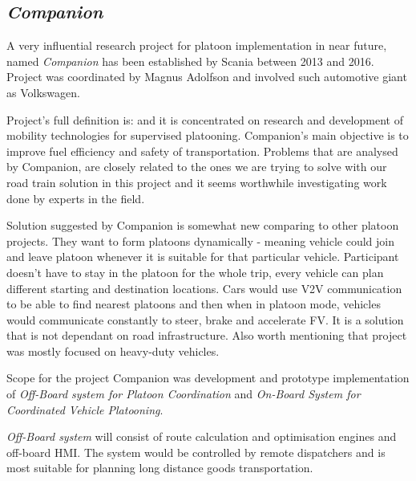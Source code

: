 \subsection{\textit{Companion}}\label{sec:Companion}
% 
A very influential research project for platoon implementation in near future, named \emph{Companion} \cite{2016CompanionProject} has been established by Scania between 2013 and 2016. Project was coordinated by Magnus Adolfson and involved such automotive giant as Volkswagen.\par
% 
Project's full definition is:  and it is concentrated on research and development of mobility technologies for supervised platooning. Companion's main objective is to improve fuel efficiency and safety of transportation.%
% 
%
% 
Problems that are analysed by Companion, are closely related to the ones we are trying to solve with our road train solution in this project and it seems worthwhile investigating work done by experts in the field\footnotemark.\par
% 
% 
Solution suggested by Companion is somewhat new comparing to other platoon projects. They want to form platoons dynamically - meaning vehicle could join and leave platoon whenever it is suitable for that particular vehicle. Participant doesn't have to stay in the platoon for the whole trip, every vehicle can plan different starting and destination locations. Cars would use \acrshort{V2V} communication to be able to find nearest platoons and then when in platoon mode, vehicles would communicate constantly to steer, brake and accelerate \acrfull{FV}. It is a solution that is not dependant on road infrastructure. Also worth mentioning that project was mostly focused on heavy-duty vehicles.\par
% 
Scope for the project Companion was development and prototype implementation of \emph{Off-Board system for Platoon Coordination} and \emph{On-Board System for Coordinated Vehicle Platooning}.\par
% 
\emph{Off-Board system} will consist of route calculation and optimisation engines and off-board \acrshort{HMI}. The system would be controlled by remote dispatchers and is most suitable for planning long distance goods transportation.\par
